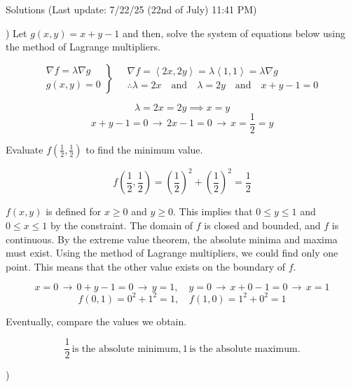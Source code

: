\documentclass{article}
\begin{document}
\newpage

\begin{center}
Solutions (Last update: 7/22/25 (22nd of July) 11:41 PM)
\end{center}

) Let $g(x,y)=x+y-1$ and then, solve the system of equations below using the method of Lagrange multipliers.

\[
\left.
\begin{array}{ll}
\displaystyle\nabla f =\lambda \nabla g \\
\displaystyle g(x,y) = 0
\end{array}
\right\}\quad
\begin{array}{ll}
\nabla f = \left\langle 2x, 2y\right\rangle = \lambda\left\langle1,1\right\rangle = \lambda\nabla g\\\therefore\displaystyle \lambda = 2x\quad \text{and}\quad \lambda = 2y\quad \text{and}\quad x+y-1=0
\end{array}
\]

\[\lambda=2x=2y\implies x=y\]
\[x+y-1=0 \,\rightarrow\, 2x-1 = 0\,\rightarrow\,x=\frac12=y\]

\hfill

\noindent Evaluate $\displaystyle f\left(\frac12,\frac12\right)$ to find the minimum value.

\[f\left(\frac12,\frac12\right)=\left(\frac12\right)^2+\left(\frac12\right)^2=\frac12\]

\hfill

\noindent $f(x,y)$ is defined for $x\geq0$ and $y\geq0$. This implies that $0\leq y \leq1$ and $0\leq x\leq1$ by the constraint. The domain of $f$ is closed and bounded, and $f$ is continuous. By the extreme value theorem, the absolute minima and maxima must exist. Using the method of Lagrange multipliers, we could find only one point. This means that the other value exists on the boundary of $f$.

\[x=0\,\rightarrow\,0+y-1=0\,\rightarrow\,y=1,\quad y=0\,\rightarrow\, x+0-1=0\,\rightarrow\, x=1\]
\[f(0,1) = 0^2 +1^2 = 1,\quad f(1,0) = 1^2+0^2 = 1\]

\hfill

\noindent Eventually, compare the values we obtain.

\[\boxed{\frac12\,\text{is the absolute minimum}, 1\,\text{is the absolute maximum}.}\]

\hfill

)
\end{document}
